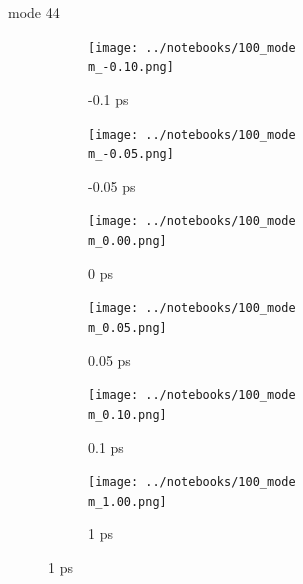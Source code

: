 \documentclass{beamer}
\begin{document}
\renewcommand\m{44}
\begin{frame}{mode \m}
	\begin{figure}
		\centering
		\begin{subfigure}[b]{\w\textwidth}
			\centering
			\texttt{[image: ../notebooks/100\_mode\\m\_-0.10.png]}
			\caption{-0.1 ps}
		\end{subfigure}
		\begin{subfigure}[b]{\w\textwidth}
			\centering
			\texttt{[image: ../notebooks/100\_mode\\m\_-0.05.png]}
			\caption{-0.05 ps}
		\end{subfigure}
		\begin{subfigure}[b]{\w\textwidth}
			\centering
			\texttt{[image: ../notebooks/100\_mode\\m\_0.00.png]}
			\caption{0 ps}
		\end{subfigure}
		\begin{subfigure}[b]{\w\textwidth}
			\centering
			\texttt{[image: ../notebooks/100\_mode\\m\_0.05.png]}
			\caption{0.05 ps}
		\end{subfigure}
		\begin{subfigure}[b]{\w\textwidth}
			\centering
			\texttt{[image: ../notebooks/100\_mode\\m\_0.10.png]}
			\caption{0.1 ps}
		\end{subfigure}
		\begin{subfigure}[b]{\w\textwidth}
			\centering
			\texttt{[image: ../notebooks/100\_mode\\m\_1.00.png]}
			\caption{1 ps}
		\end{subfigure}
	\end{figure}
\end{frame}
\end{document}

